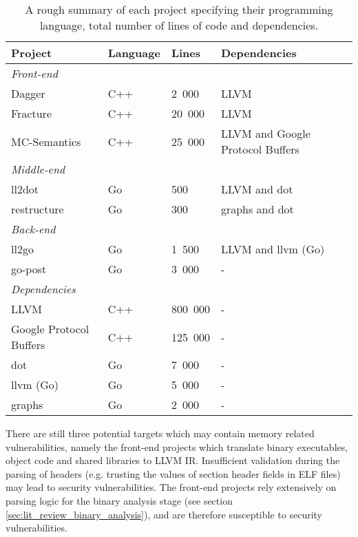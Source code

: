 \begin{table}[htbp]
	\begin{center}
		\begin{tabular}{|l|l|l|l|}
			\hline
			\textbf{Project} & \textbf{Language} & \textbf{Lines} & \textbf{Dependencies} \\
			\hline
			\multicolumn{4}{|l|}{\hspace{4ex} \textit{Front-end}} \\
			\hline
			Dagger & C++ & 2~000 & LLVM \\
			Fracture & C++ & 20~000 & LLVM \\
			MC-Semantics & C++ & 25~000 & LLVM and Google Protocol Buffers \\
			\hline
			\multicolumn{4}{|l|}{\hspace{4ex} \textit{Middle-end}} \\
			\hline
			ll2dot & Go & 500 & LLVM and dot \\
			restructure & Go & 300 & graphs and dot \\
			\hline
			\multicolumn{4}{|l|}{\hspace{4ex} \textit{Back-end}} \\
			\hline
			ll2go & Go & 1~500 & LLVM and llvm (Go) \\
			go-post & Go & 3~000 & - \\
			\hline
			\multicolumn{4}{|l|}{\hspace{4ex} \textit{Dependencies}} \\
			\hline
			LLVM & C++ & 800~000 & - \\
			Google Protocol Buffers & C++ & 125~000 & - \\
			dot & Go & 7~000 & - \\
			llvm (Go) & Go & 5~000 & - \\
			graphs & Go & 2~000 & - \\
			\hline
		\end{tabular}
	\end{center}
	\caption{A rough summary of each project specifying their programming language, total number of lines of code and dependencies.}
	\label{tbl:loc_summary}
\end{table}

There are still three potential targets which may contain memory related vulnerabilities, namely the front-end projects which translate binary executables, object code and shared libraries to LLVM IR. Insufficient validation during the parsing of headers (e.g. trusting the values of section header fields in ELF files) may lead to security vulnerabilities. The front-end projects rely extensively on parsing logic for the binary analysis stage (see section \ref{sec:lit_review_binary_analysis}), and are therefore susceptible to security vulnerabilities.


